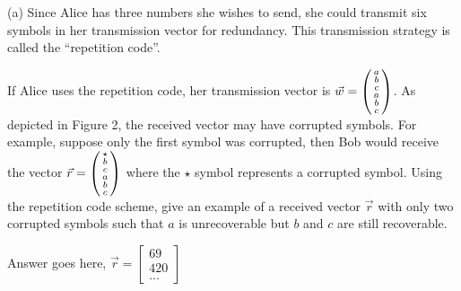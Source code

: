 \documentclass[11pt]{article}
\begin{document}
    (a) Since Alice has three numbers she wishes to send, she could transmit six symbols in her transmission vector for redundancy. This transmission strategy is called the “repetition code”.
    
    If Alice uses the repetition code, her transmission vector is $\vec w =
                                                                    \begin{psmallmatrix}
                                                                    a \\
                                                                    b \\
                                                                    c \\
                                                                    a \\
                                                                    b \\
                                                                    c
                                                                    \end{psmallmatrix}
                                                                  $.
    As depicted in Figure 2, the received vector may have corrupted symbols. For example, suppose only the first symbol was corrupted, then Bob would receive the vector $\vec r =
                    \begin{psmallmatrix}
                        \star \\
                            b \\
                            c \\
                            a \\
                            b \\
                            c
                    \end{psmallmatrix}
            $ where the $\star$ symbol represents a corrupted symbol. Using the repetition code scheme, give an example of a received vector $\vec r$ with only two corrupted symbols such that $a$ is unrecoverable but $b$ and $c$ are still recoverable.
    \begin{Answer}
        Answer goes here, $\vec r =
                    \begin{bmatrix}
                        69 \\
                        420 \\
                        \ldots
                    \end{bmatrix}
            $
    \end{Answer}
\end{document}
